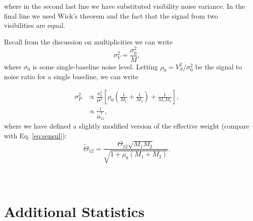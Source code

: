 \documentclass[twocolumn,apj,numberedappendix]{emulateapj}
\renewcommand\[{\begin{equation}}
\renewcommand\]{\end{equation}}
\begin{document}
where in the second last line we have substituted visibility noise variance. In the final line we used Wick's theorem and the fact that the signal from two visibilities are equal. 

Recall from the discussion on multiplicities we can write
\begin{equation}
\sigma_V^2=\frac{\sigma_0^2}{M},
\end{equation}
where $\sigma_0$ is some single-baseline noise level. Letting $\rho_0=V_S^2/\sigma_0^2$ be the signal to noise ratio for a single baseline, we can write

\begin{equation}
\begin{aligned}
\sigma_P^2 & \propto  \frac{\sigma_0^4}{\Theta^2} \left[ \rho_0 \left(\frac{1}{M_1}+\frac{1}{M_2} \right) + \frac{1}{M_1 M_2}\right], \\
&\propto \frac{1}{\widetilde{\Theta}_{12}^2},
\end{aligned}
\end{equation}
where we have defined a slightly modified version of the effective weight (compare with Eq. \ref{eq:sensul}):
\begin{equation}
\widetilde{\Theta}_{12}=\frac{\Theta_{12}\sqrt{M_1M_{2}}}{\sqrt{1 + \rho_0 \left(M_1+M_{2} \right)}}.
\end{equation}



\section{\label{sec:fullstats}\\Additional Statistics}
\end{document}
